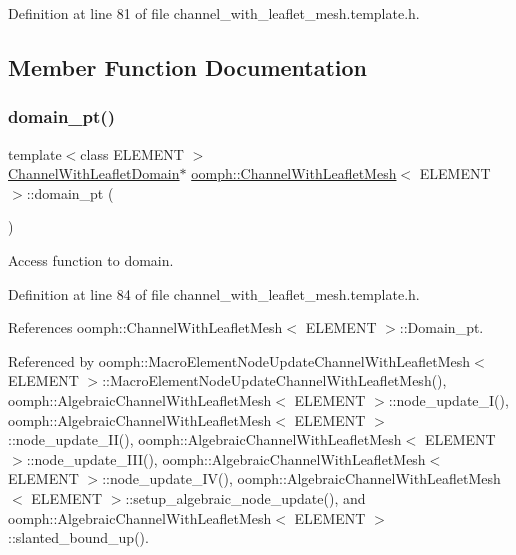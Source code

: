 Definition at line 81 of file channel\+\_\+with\+\_\+leaflet\+\_\+mesh.\+template.\+h.



\subsection{Member Function Documentation}
\mbox{\label{classoomph_1_1ChannelWithLeafletMesh_a775c95ffa8fb9b7b512fc767528eab22}} 
\subsubsection{\texorpdfstring{domain\+\_\+pt()}{domain\_pt()}}
{\footnotesize\ttfamily template$<$class E\+L\+E\+M\+E\+NT $>$ \\
\hyperlink{classoomph_1_1ChannelWithLeafletDomain}{Channel\+With\+Leaflet\+Domain}$\ast$ \hyperlink{classoomph_1_1ChannelWithLeafletMesh}{oomph\+::\+Channel\+With\+Leaflet\+Mesh}$<$ E\+L\+E\+M\+E\+NT $>$\+::domain\+\_\+pt (\begin{DoxyParamCaption}{ }\end{DoxyParamCaption})\hspace{0.3cm}{\ttfamily [inline]}}



Access function to domain. 



Definition at line 84 of file channel\+\_\+with\+\_\+leaflet\+\_\+mesh.\+template.\+h.



References oomph\+::\+Channel\+With\+Leaflet\+Mesh$<$ E\+L\+E\+M\+E\+N\+T $>$\+::\+Domain\+\_\+pt.



Referenced by oomph\+::\+Macro\+Element\+Node\+Update\+Channel\+With\+Leaflet\+Mesh$<$ E\+L\+E\+M\+E\+N\+T $>$\+::\+Macro\+Element\+Node\+Update\+Channel\+With\+Leaflet\+Mesh(), oomph\+::\+Algebraic\+Channel\+With\+Leaflet\+Mesh$<$ E\+L\+E\+M\+E\+N\+T $>$\+::node\+\_\+update\+\_\+\+I(), oomph\+::\+Algebraic\+Channel\+With\+Leaflet\+Mesh$<$ E\+L\+E\+M\+E\+N\+T $>$\+::node\+\_\+update\+\_\+\+I\+I(), oomph\+::\+Algebraic\+Channel\+With\+Leaflet\+Mesh$<$ E\+L\+E\+M\+E\+N\+T $>$\+::node\+\_\+update\+\_\+\+I\+I\+I(), oomph\+::\+Algebraic\+Channel\+With\+Leaflet\+Mesh$<$ E\+L\+E\+M\+E\+N\+T $>$\+::node\+\_\+update\+\_\+\+I\+V(), oomph\+::\+Algebraic\+Channel\+With\+Leaflet\+Mesh$<$ E\+L\+E\+M\+E\+N\+T $>$\+::setup\+\_\+algebraic\+\_\+node\+\_\+update(), and oomph\+::\+Algebraic\+Channel\+With\+Leaflet\+Mesh$<$ E\+L\+E\+M\+E\+N\+T $>$\+::slanted\+\_\+bound\+\_\+up().



